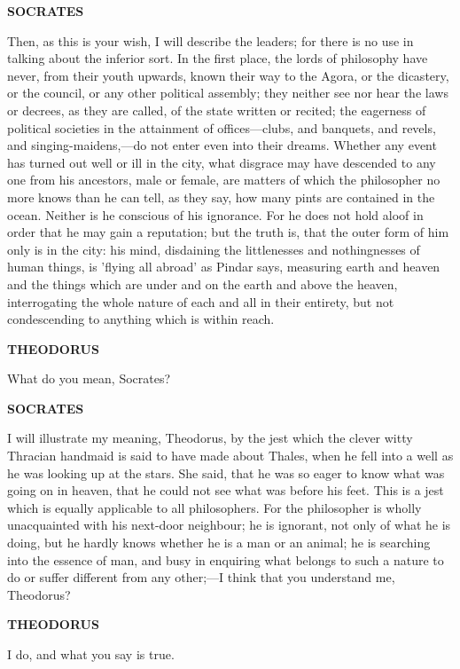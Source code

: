 \documentclass[11pt,letter]{article}
\begin{document}
\par \textbf{SOCRATES}
\par   Then, as this is your wish, I will describe the leaders; for there is no use in talking about the inferior sort. In the first place, the lords of philosophy have never, from their youth upwards, known their way to the Agora, or the dicastery, or the council, or any other political assembly; they neither see nor hear the laws or decrees, as they are called, of the state written or recited; the eagerness of political societies in the attainment of offices—clubs, and banquets, and revels, and singing-maidens,—do not enter even into their dreams. Whether any event has turned out well or ill in the city, what disgrace may have descended to any one from his ancestors, male or female, are matters of which the philosopher no more knows than he can tell, as they say, how many pints are contained in the ocean. Neither is he conscious of his ignorance. For he does not hold aloof in order that he may gain a reputation; but the truth is, that the outer form of him only is in the city:  his mind, disdaining the littlenesses and nothingnesses of human things, is 'flying all abroad' as Pindar says, measuring earth and heaven and the things which are under and on the earth and above the heaven, interrogating the whole nature of each and all in their entirety, but not condescending to anything which is within reach.

\par \textbf{THEODORUS}
\par   What do you mean, Socrates?

\par \textbf{SOCRATES}
\par   I will illustrate my meaning, Theodorus, by the jest which the clever witty Thracian handmaid is said to have made about Thales, when he fell into a well as he was looking up at the stars. She said, that he was so eager to know what was going on in heaven, that he could not see what was before his feet. This is a jest which is equally applicable to all philosophers. For the philosopher is wholly unacquainted with his next-door neighbour; he is ignorant, not only of what he is doing, but he hardly knows whether he is a man or an animal; he is searching into the essence of man, and busy in enquiring what belongs to such a nature to do or suffer different from any other;—I think that you understand me, Theodorus?

\par \textbf{THEODORUS}
\par   I do, and what you say is true.
\end{document}
